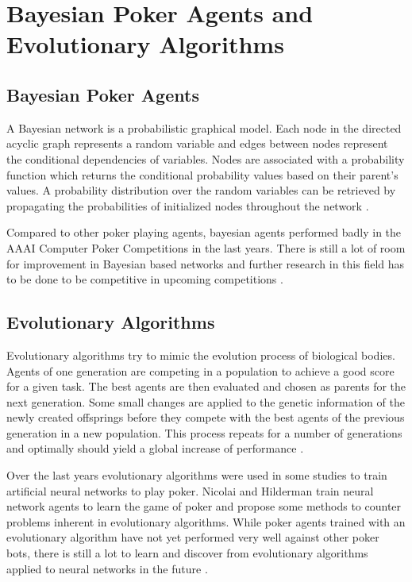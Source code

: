 \section{Bayesian Poker Agents and Evolutionary Algorithms}
\subsection{Bayesian Poker Agents}
A Bayesian network is a probabilistic graphical model. Each node in the directed acyclic graph represents a random variable and edges between nodes represent the conditional dependencies of variables. Nodes are associated with a probability function which returns the conditional probability values based on their parent's values. A probability distribution over the random variables can be retrieved by propagating the probabilities of initialized nodes throughout the network \cite{review}. \par
Compared to other poker playing agents, bayesian agents performed badly in the AAAI Computer Poker Competitions in the last years. There is still a lot of room for improvement in Bayesian based networks and further research in this field has to be done to be competitive in upcoming competitions \cite{review}. 
\subsection{Evolutionary Algorithms}
Evolutionary algorithms try to mimic the evolution process of biological bodies. Agents of one generation are competing in a population to achieve a good score for a given task. The best agents are then evaluated and chosen as parents for the next generation. Some small changes are applied to the genetic information of the newly created offsprings before they compete with the best agents of the previous generation in a new population. This process repeats for a number of generations and optimally should yield a global increase of performance \cite{evolutionary_methods}.\par
Over the last years evolutionary algorithms were used in some studies to train artificial neural networks to play poker. Nicolai and Hilderman \cite{nn_evolve} train neural network agents to learn the game of poker and propose some methods to counter problems inherent in evolutionary algorithms. While poker agents trained with an evolutionary algorithm have not yet performed very well against other poker bots, there is still a lot to learn and discover from evolutionary algorithms applied to neural networks in the future \cite{review}. 
